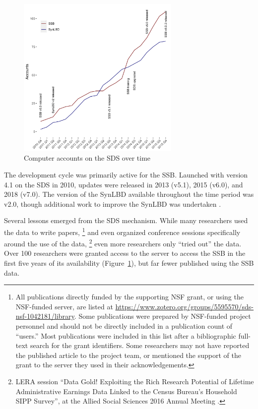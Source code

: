 \documentclass[12pt]{article}
\begin{document}
\begin{figure}[h]
    \centering
    \includegraphics[width=0.7\textwidth]{figs/accounts-2015.png}
    \caption{Computer accounts on the SDS over time}
    \label{fig:growth_in_sds}
\end{figure}

The development cycle was primarily active for the \ac{SSB}. Launched with version 4.1 on the \ac{SDS} in 2010, updates were released in 2013 (v5.1), 2015 (v6.0), and 2018 (v7.0). The version of the \ac{SynLBD} available throughout the time period was v2.0, though additional work to improve the \ac{SynLBD} was undertaken \citep{SJIAOS-2014d}.




Several lessons emerged from the SDS mechanism. While many researchers used the data to write papers,
%
\footnote{All publications directly funded by the supporting NSF grant, or using the NSF-funded server, are listed at \url{https://www.zotero.org/groups/5595570/sds-nsf-1042181/library}. Some publications were prepared by NSF-funded project personnel and should not be directly included in a publication count of ``users.'' Most publications were included in this list after a bibliographic full-text search for the grant identifiers. Some researchers may not have reported the published article to the project team, or mentioned the support of the grant to the server they used in their acknowledgements.} 
%
and even organized conference sessions specifically around the use of the data,
%
\footnote{LERA session ``Data Gold! Exploiting the Rich Research Potential of Lifetime
Administrative Earnings Data Linked to the Census Bureau’s
Household SIPP Survey'',  at the Allied Social Sciences 2016 Annual Meeting \citep{american_economic_association_allied_2016}. }
%
even more researchers only ``tried out'' the data. Over 100 researchers were granted access to the server to access the SSB in the first five years of its availability (Figure~\ref{fig:growth_in_sds}), but far fewer published using the SSB data. 
\end{document}
